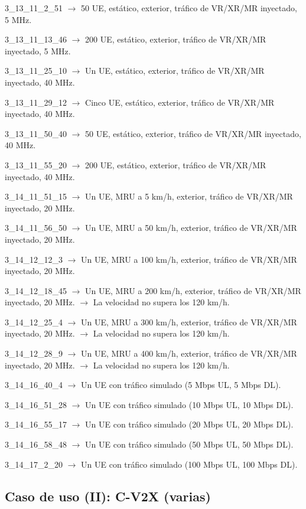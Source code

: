 \documentclass[12pt]{report} %
\begin{document}
3\_13\_11\_2\_51 $\rightarrow$ 50 UE, estático, exterior, tráfico de VR/XR/MR inyectado, 5 MHz.

3\_13\_11\_13\_46 $\rightarrow$ 200 UE, estático, exterior, tráfico de VR/XR/MR inyectado, 5 MHz.

3\_13\_11\_25\_10 $\rightarrow$ Un UE, estático, exterior, tráfico de VR/XR/MR inyectado, 40 MHz.

3\_13\_11\_29\_12 $\rightarrow$ Cinco UE, estático, exterior, tráfico de VR/XR/MR inyectado, 40 MHz.

3\_13\_11\_50\_40 $\rightarrow$ 50 UE, estático, exterior, tráfico de VR/XR/MR inyectado, 40 MHz.

3\_13\_11\_55\_20 $\rightarrow$ 200 UE, estático, exterior, tráfico de VR/XR/MR inyectado, 40 MHz.

3\_14\_11\_51\_15 $\rightarrow$ Un UE, MRU a 5 km/h, exterior, tráfico de VR/XR/MR inyectado, 20 MHz.

3\_14\_11\_56\_50 $\rightarrow$ Un UE, MRU a 50 km/h, exterior, tráfico de VR/XR/MR inyectado, 20 MHz.

3\_14\_12\_12\_3 $\rightarrow$ Un UE, MRU a 100 km/h, exterior, tráfico de VR/XR/MR inyectado, 20 MHz.

3\_14\_12\_18\_45 $\rightarrow$ Un UE, MRU a 200 km/h, exterior, tráfico de VR/XR/MR inyectado, 20 MHz. $\rightarrow$ La velocidad no supera los 120 km/h.

3\_14\_12\_25\_4 $\rightarrow$ Un UE, MRU a 300 km/h, exterior, tráfico de VR/XR/MR inyectado, 20 MHz. $\rightarrow$ La velocidad no supera los 120 km/h.

3\_14\_12\_28\_9 $\rightarrow$ Un UE, MRU a 400 km/h, exterior, tráfico de VR/XR/MR inyectado, 20 MHz. $\rightarrow$ La velocidad no supera los 120 km/h.

3\_14\_16\_40\_4 $\rightarrow$ Un UE con tráfico simulado (5 Mbps UL, 5 Mbps DL).

3\_14\_16\_51\_28 $\rightarrow$ Un UE con tráfico simulado (10 Mbps UL, 10 Mbps DL).

3\_14\_16\_55\_17 $\rightarrow$ Un UE con tráfico simulado (20 Mbps UL, 20 Mbps DL).

3\_14\_16\_58\_48 $\rightarrow$ Un UE con tráfico simulado (50 Mbps UL, 50 Mbps DL).

3\_14\_17\_2\_20 $\rightarrow$ Un UE con tráfico simulado (100 Mbps UL, 100 Mbps DL).

\subsection* {Caso de uso (II): C-V2X (varias)}
\end{document}
